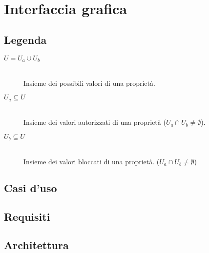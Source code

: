 \chapter{Interfaccia grafica}
\label{ch:appendice:interfaccia-grafica}

\section*{Legenda}
\begin{description}
	\item[$U = U_a \cup U_b$] \hfill \\
	Insieme dei possibili valori di una proprietà.
	\item[$U_a \subseteq U$] \hfill \\
	Insieme dei valori autorizzati di una proprietà ($U_a \cap U_b \neq \emptyset$).
	\item[$U_b \subseteq U$] \hfill \\
	Insieme dei valori bloccati di una proprietà. ($U_a \cap U_b \neq \emptyset$)
\end{description}	

\section*{Casi d'uso}
\section*{Requisiti}
\section*{Architettura}
